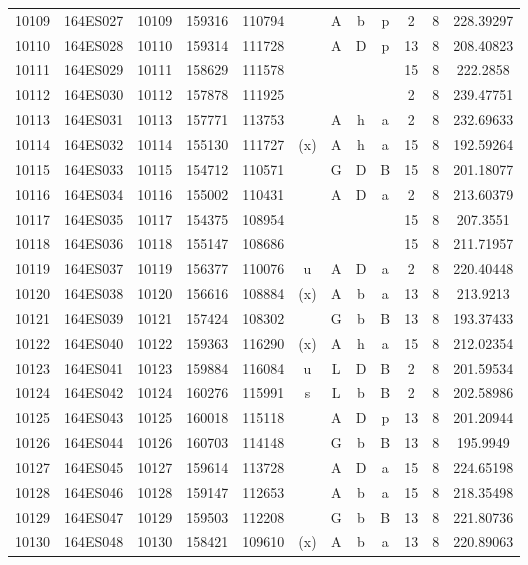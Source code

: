 \begin{tabular}{|*{12}{c|}}
10109 & 164ES027 & 10109 & 159316 & 110794 &  & A & b & p & 2 & 8 & 228.39297 \\ 
10110 & 164ES028 & 10110 & 159314 & 111728 &  & A & D & p & 13 & 8 & 208.40823 \\ 
10111 & 164ES029 & 10111 & 158629 & 111578 &  &  &  &  & 15 & 8 & 222.2858 \\ 
10112 & 164ES030 & 10112 & 157878 & 111925 &  &  &  &  & 2 & 8 & 239.47751 \\ 
10113 & 164ES031 & 10113 & 157771 & 113753 &  & A & h & a & 2 & 8 & 232.69633 \\ 
10114 & 164ES032 & 10114 & 155130 & 111727 & (x) & A & h & a & 15 & 8 & 192.59264 \\ 
10115 & 164ES033 & 10115 & 154712 & 110571 &  & G & D & B & 15 & 8 & 201.18077 \\ 
10116 & 164ES034 & 10116 & 155002 & 110431 &  & A & D & a & 2 & 8 & 213.60379 \\ 
10117 & 164ES035 & 10117 & 154375 & 108954 &  &  &  &  & 15 & 8 & 207.3551 \\ 
10118 & 164ES036 & 10118 & 155147 & 108686 &  &  &  &  & 15 & 8 & 211.71957 \\ 
10119 & 164ES037 & 10119 & 156377 & 110076 & u & A & D & a & 2 & 8 & 220.40448 \\ 
10120 & 164ES038 & 10120 & 156616 & 108884 & (x) & A & b & a & 13 & 8 & 213.9213 \\ 
10121 & 164ES039 & 10121 & 157424 & 108302 &  & G & b & B & 13 & 8 & 193.37433 \\ 
10122 & 164ES040 & 10122 & 159363 & 116290 & (x) & A & h & a & 15 & 8 & 212.02354 \\ 
10123 & 164ES041 & 10123 & 159884 & 116084 & u & L & D & B & 2 & 8 & 201.59534 \\ 
10124 & 164ES042 & 10124 & 160276 & 115991 & s & L & b & B & 2 & 8 & 202.58986 \\ 
10125 & 164ES043 & 10125 & 160018 & 115118 &  & A & D & p & 13 & 8 & 201.20944 \\ 
10126 & 164ES044 & 10126 & 160703 & 114148 &  & G & b & B & 13 & 8 & 195.9949 \\ 
10127 & 164ES045 & 10127 & 159614 & 113728 &  & A & D & a & 15 & 8 & 224.65198 \\ 
10128 & 164ES046 & 10128 & 159147 & 112653 &  & A & b & a & 15 & 8 & 218.35498 \\ 
10129 & 164ES047 & 10129 & 159503 & 112208 &  & G & b & B & 13 & 8 & 221.80736 \\ 
10130 & 164ES048 & 10130 & 158421 & 109610 & (x) & A & b & a & 13 & 8 & 220.89063 \\ 

\end{tabular}
